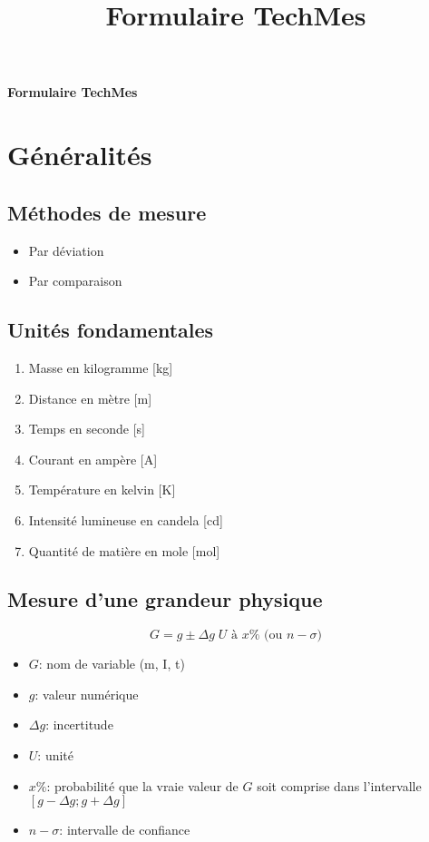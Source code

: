 \documentclass[10pt, twocolumn]{article}
\title{Formulaire TechMes}
\begin{document}
	
	\begin{center}
		{\Large \bf Formulaire TechMes} \\
	\end{center}
	
	\section*{Généralités}
		
		\subsection*{Méthodes de mesure}
		
			\begin{itemize}
				\item Par déviation
				\item Par comparaison
			\end{itemize}
			
		\subsection*{Unités fondamentales}
			
			\begin{enumerate}
				\item Masse en kilogramme [kg]
				\item Distance en mètre [m]
				\item Temps en seconde [s]
				\item Courant en ampère [A]
				\item Température en kelvin [K]
				\item Intensité lumineuse en candela [cd]
				\item Quantité de matière en mole [mol]
			\end{enumerate}
			
		\subsection*{Mesure d'une grandeur physique}
			
			\[G = g \pm \Delta g \; U \text{ à } x\% \text{ (ou }n-\sigma)\]
			
			\begin{itemize}
				\item $G$: nom de variable (m, I, t)
				\item $g$: valeur numérique
				\item $\Delta g$: incertitude
				\item $U$: unité
				\item $x\%$: probabilité que la vraie valeur de $G$ soit comprise dans l'intervalle $[g-\Delta g;g+\Delta g]$
				\item $n-\sigma$: intervalle de confiance
			\end{itemize}
			
\end{document}
